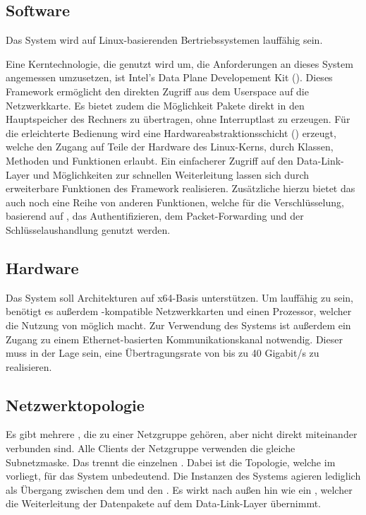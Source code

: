   
\subsection{Software}
Das System wird auf Linux-basierenden Bertriebssystemen lauffähig sein.

Eine Kerntechnologie, die genutzt wird um, die Anforderungen an dieses System angemessen umzusetzen, ist Intel's Data Plane Developement Kit (). 
Dieses Framework ermöglicht den direkten Zugriff aus dem Userspace auf die Netzwerkkarte. Es bietet zudem die Möglichkeit Pakete direkt in den Hauptspeicher des Rechners zu übertragen, ohne Interruptlast zu erzeugen. 
Für die erleichterte Bedienung wird eine Hardwareabstraktionsschicht () erzeugt, welche den Zugang auf Teile der Hardware des Linux-Kerns, durch Klassen, Methoden und Funktionen erlaubt.
Ein einfacherer Zugriff auf den Data-Link-Layer und Möglichkeiten zur schnellen Weiterleitung lassen sich durch erweiterbare Funktionen des Framework realisieren.
Zusätzliche hierzu bietet das  auch noch eine Reihe von anderen Funktionen, welche für die Verschlüsselung, basierend auf , das Authentifizieren, dem Packet-Forwarding und der Schlüsselaushandlung genutzt werden.

\subsection{Hardware}

Das System soll Architekturen auf x64-Basis unterstützen. 
Um lauffähig zu sein, benötigt es außerdem -kompatible Netzwerkkarten und einen Prozessor, welcher die Nutzung von  möglich macht.
Zur Verwendung des Systems ist außerdem ein Zugang zu einem Ethernet-basierten Kommunikationskanal notwendig.
Dieser muss in der Lage sein, eine Übertragungsrate von bis zu 40 Gigabit/s zu realisieren.

\subsection{Netzwerktopologie}

Es gibt mehrere , die zu einer Netzgruppe gehören, aber nicht direkt miteinander verbunden sind.
Alle Clients der Netzgruppe verwenden die gleiche Subnetzmaske.
Das  trennt die einzelnen . 
Dabei ist die Topologie, welche im  vorliegt, für das System unbedeutend.
Die Instanzen des Systems agieren lediglich als Übergang zwischen dem  und den .
Es wirkt nach außen hin wie ein , welcher die Weiterleitung der Datenpakete auf dem Data-Link-Layer übernimmt. 







